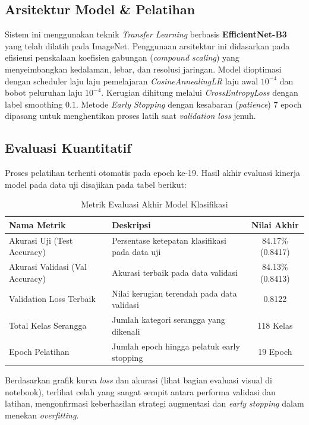 \documentclass[12pt, a4paper]{article}
\begin{document}
\subsection{Arsitektur Model & Pelatihan}
Sistem ini menggunakan teknik \textit{Transfer Learning} berbasis \textbf{EfficientNet-B3} yang telah dilatih pada ImageNet. Penggunaan arsitektur ini didasarkan pada efisiensi penskalaan koefisien gabungan (\textit{compound scaling}) yang menyeimbangkan kedalaman, lebar, dan resolusi jaringan. Model dioptimasi dengan scheduler laju laju pemelajaran \textit{CosineAnnealingLR} laju awal $10^{-4}$ dan bobot peluruhan laju $10^{-4}$. Kerugian dihitung melalui \textit{CrossEntropyLoss} dengan label smoothing $0.1$. Metode \textit{Early Stopping} dengan kesabaran (\textit{patience}) 7 epoch dipasang untuk menghentikan proses latih saat \textit{validation loss} jenuh.

\subsection{Evaluasi Kuantitatif}
Proses pelatihan terhenti otomatis pada epoch ke-19. Hasil akhir evaluasi kinerja model pada data uji disajikan pada tabel berikut:

\begin{table}[H]
\centering
\caption{Metrik Evaluasi Akhir Model Klasifikasi}
\label{tab:metrics}
\begin{tabularx}{\textwidth}{l X c}
\toprule
\rowcolor{tblhead}
\textbf{Nama Metrik} & \textbf{Deskripsi} & \textbf{Nilai Akhir} \\
\midrule
Akurasi Uji (Test Accuracy) & Persentase ketepatan klasifikasi pada data uji & 84.17\% (0.8417) \\
Akurasi Validasi (Val Accuracy) & Akurasi terbaik pada data validasi & 84.13\% (0.8413) \\
Validation Loss Terbaik & Nilai kerugian terendah pada data validasi & 0.8122 \\
Total Kelas Serangga & Jumlah kategori serangga yang dikenali & 118 Kelas \\
Epoch Pelatihan & Jumlah epoch hingga pelatuk early stopping & 19 Epoch \\
\bottomrule
\end{tabularx}
\end{table}

Berdasarkan grafik kurva \textit{loss} dan akurasi (lihat bagian evaluasi visual di notebook), terlihat celah yang sangat sempit antara performa validasi dan latihan, mengonfirmasi keberhasilan strategi augmentasi dan \textit{early stopping} dalam menekan \textit{overfitting}.
\end{document}
